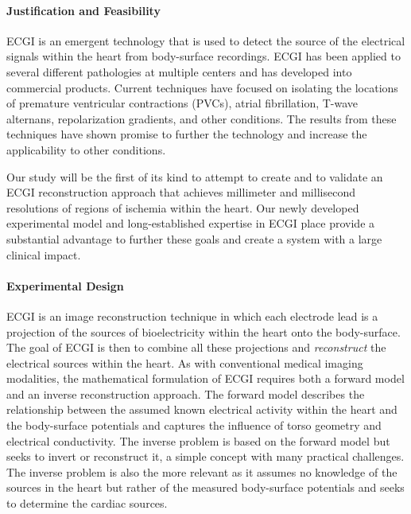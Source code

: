 \paragraph{Justification and Feasibility}
 ECGI is an emergent technology that
 is used to detect the source of the electrical signals within the heart
 from body-surface recordings.
ECGI has been applied to several different pathologies at multiple centers
and has developed into commercial products. Current techniques have focused
on isolating the locations of premature ventricular contractions (PVCs), atrial
fibrillation, T-wave alternans, repolarization gradients, and other
conditions.\cite{BLZ:Pot2014,BLZ:Dub2015,BLZ:Wan2016a,RSM:Sha2015,BLZ:Wan2018}
The results from these techniques have shown promise to further the
technology and increase the applicability to other conditions.

Our study will be the first of its kind to attempt to create and to
validate an ECGI reconstruction approach that achieves millimeter and
millisecond resolutions of regions of ischemia within the heart. Our newly
developed experimental model and long-established expertise in ECGI place
provide a substantial advantage to further these goals and create a system
with a large clinical impact.


\paragraph{Experimental Design} ECGI is an image reconstruction technique in
which each electrode lead is a projection of the sources of bioelectricity
within the heart onto the body-surface.\cite{RSM:Mes86,RSM:Pul2010} The
goal of ECGI is then to combine all these projections and
\emph{reconstruct} the electrical sources within the heart. As with
conventional medical imaging modalities, the mathematical formulation of
ECGI requires both a forward model and an inverse reconstruction
approach. The forward model describes the relationship between the assumed
known electrical activity within the heart and the body-surface potentials
and captures the influence of torso geometry and electrical
conductivity.\cite{RSM:Mac2010b} The inverse problem is based on the
forward model but seeks to invert or reconstruct it, a simple concept with
many practical challenges.  The inverse problem is also the more relevant
as it assumes no knowledge of the sources in the heart but rather of the
measured body-surface potentials and seeks to determine the cardiac
sources.\cite{RSM:Mes86,RSM:Pul2010}

